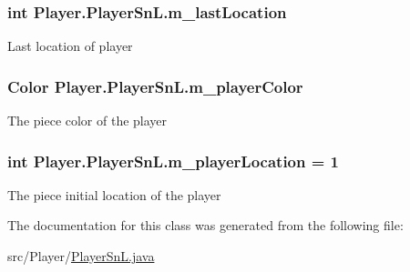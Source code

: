 \subsubsection[{m\+\_\+last\+Location}]{\setlength{\rightskip}{0pt plus 5cm}int Player.\+Player\+Sn\+L.\+m\+\_\+last\+Location}\label{class_player_1_1_player_sn_l_a67ec420adf012813b5b6bf74237e0180}
Last location of player \hypertarget{class_player_1_1_player_sn_l_a9fb98bcd7461b8b5a3193ecc8d00fcaa}{}
\subsubsection[{m\+\_\+player\+Color}]{\setlength{\rightskip}{0pt plus 5cm}Color Player.\+Player\+Sn\+L.\+m\+\_\+player\+Color}\label{class_player_1_1_player_sn_l_a9fb98bcd7461b8b5a3193ecc8d00fcaa}
The piece color of the player \hypertarget{class_player_1_1_player_sn_l_a9ff667423ca24b7b21b9775117156d68}{}
\subsubsection[{m\+\_\+player\+Location}]{\setlength{\rightskip}{0pt plus 5cm}int Player.\+Player\+Sn\+L.\+m\+\_\+player\+Location = 1}\label{class_player_1_1_player_sn_l_a9ff667423ca24b7b21b9775117156d68}
The piece initial location of the player 

The documentation for this class was generated from the following file\+:\begin{DoxyCompactItemize}
\item 
src/\+Player/\hyperlink{_player_sn_l_8java}{Player\+Sn\+L.\+java}\end{DoxyCompactItemize}
